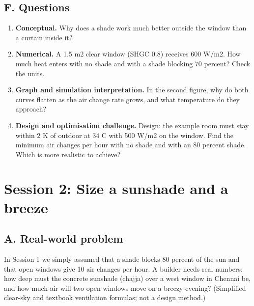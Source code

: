 \documentclass[11pt,a4paper]{article}
\begin{document}
\subsection*{F. Questions}
\begin{enumerate}[nosep]
\item \textbf{Conceptual.} Why does a shade work much better outside the window than a curtain inside it?
\item \textbf{Numerical.} A 1.5 m2 clear window (SHGC 0.8) receives 600 W/m2. How much heat enters with no shade and with a shade blocking 70 percent? Check the units.
\item \textbf{Graph and simulation interpretation.} In the second figure, why do both curves flatten as the air change rate grows, and what temperature do they approach?
\item \textbf{Design and optimisation challenge.} Design: the example room must stay within 2 K of outdoor at 34 C with 500 W/m2 on the window. Find the minimum air changes per hour with no shade and with an 80 percent shade. Which is more realistic to achieve?
\end{enumerate}

\section{Session 2: Size a sunshade and a breeze}

\subsection*{A. Real-world problem}
In Session 1 we simply assumed that a shade blocks 80 percent of the sun and that open windows give 10 air changes per hour. A builder needs real numbers: how deep must the concrete sunshade (chajja) over a west window in Chennai be, and how much air will two open windows move on a breezy evening? (Simplified clear-sky and textbook ventilation formulas; not a design method.)
\end{document}
